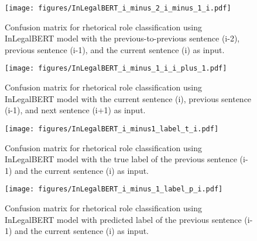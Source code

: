 \begin{figure}[ht]
    \centering
    \texttt{[image: figures/InLegalBERT\_i\_minus\_2\_i\_minus\_1\_i.pdf]}
    \caption{Confusion matrix for rhetorical role classification using InLegalBERT model with the previous-to-previous sentence (i-2), previous sentence (i-1), and the current sentence (i) as input.}
\label{fig:inlegalbert_i-2_i-1_i}

\end{figure}

\begin{figure}[ht]
    \centering
    \texttt{[image: figures/InLegalBERT\_i\_minus\_1\_i\_i\_plus\_1.pdf]}
    \caption{Confusion matrix for rhetorical role classification using InLegalBERT model with the current sentence (i), previous sentence (i-1), and next sentence (i+1) as input.}
\label{fig:inlegalbert_i-1_i_i+1}

\end{figure}

\begin{figure}[ht]
    \centering
    \texttt{[image: figures/InLegalBERT\_i\_minus1\_label\_t\_i.pdf]}
    \caption{Confusion matrix for rhetorical role classification using InLegalBERT model with the true label of the previous sentence (i-1) and the current sentence (i) as input.}
\label{fig:inlegalbert_label_t}

\end{figure}

\begin{figure}[ht]
    \centering
    \texttt{[image: figures/InLegalBERT\_i\_minus\_1\_label\_p\_i.pdf]}
    \caption{Confusion matrix for rhetorical role classification using InLegalBERT model with predicted label of the previous sentence (i-1) and the current sentence (i) as input.}
\label{fig:inlegalbert_label_p}

\end{figure}
